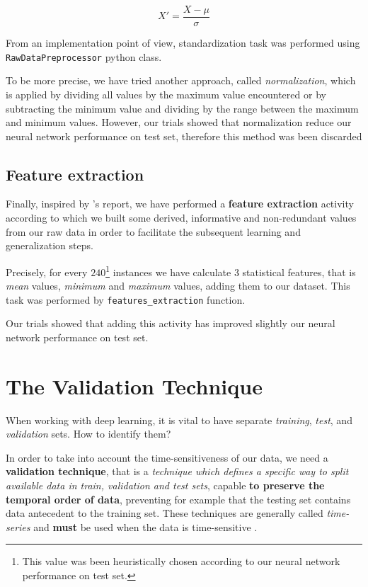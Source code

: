 \documentclass[sigconf]{acmart}
\begin{document}
\begin{equation}
X' = \dfrac{X - \mu}{\sigma}
\end{equation}

From an implementation point of view, standardization task was performed using  \texttt{RawDataPreprocessor} python class.

To be more precise, we have tried another approach, called \textit{normalization}, which is applied by dividing all values by the maximum value encountered or by subtracting the minimum value and dividing by the range between the maximum and minimum values. However, our trials showed that normalization reduce our neural network performance on test set, therefore this method was been discarded

\subsection{Feature extraction}

Finally, inspired by \citet{meaninpiu}'s report, we have performed a \textbf{feature extraction} activity according to which we built some derived, informative and non-redundant values from our raw data in order to facilitate the subsequent learning and generalization steps.

Precisely, for every $240$\footnote{This value was been heuristically chosen according to our neural network performance on test set.} instances we have calculate $3$ statistical features, that is \textit{mean} values, \textit{minimum} and \textit{maximum} values, adding them to our dataset. This task was performed by \texttt{featu\-res\_extra\-ction} function. 

Our trials showed that adding this activity has improved slightly our neural network performance on test set. 

\section{The Validation Technique}

When working with deep learning, it is vital to have separate \textit{training}, \textit{test}, and \textit{validation} sets. How to identify them?

In order to take into account the time-sensitiveness of our data, we need a \textbf{validation technique}, that is a \textit{technique which defines a specific way to split available data in train, validation and test sets}, capable \textbf{to preserve the temporal order of data}, preventing for example that the testing set contains data antecedent to the training set. These techniques are generally called \textit{time-series} and \textbf{must} be used when the data is time-sensitive \cite{Falessi}.
\end{document}
